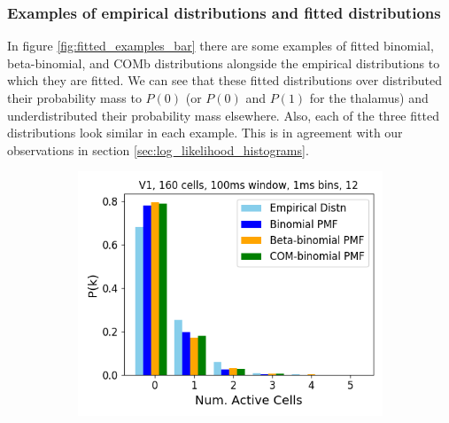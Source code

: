     \subsubsection{Examples of empirical distributions and fitted distributions}
    In figure \ref{fig:fitted_examples_bar} there are some examples of fitted binomial, beta-binomial, and COMb distributions alongside the empirical distributions to which they are fitted. We can see that these fitted distributions over distributed their probability mass to $P(0)$ (or $P(0)$ and $P(1)$ for the thalamus) and underdistributed their probability mass elsewhere. Also, each of the three fitted distributions look similar in each example. This is in agreement with our observations in section \ref{sec:log_likelihood_histograms}.

    \begin{figure}[p]
      \begin{subfigure}[h]{0.5\linewidth}
        \includegraphics[width=\linewidth]{figures/conway_maxwell/v1_1ms_trial_12_example.png}
        \label{fig:v1_1ms_trial_12_example}
      \end{subfigure}
      \begin{subfigure}[h]{0.5\linewidth}

\end{subfigure}
\end{figure}
